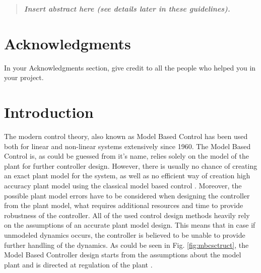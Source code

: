 \documentclass[]{final_report}
\begin{document}
\maketitle

\tableofcontents
\newpage


\begin{abstract}

\textbf{\textsl{Insert abstract here (see details later in these guidelines).}}

\end{abstract}
\newpage


\chapter*{Acknowledgments}

In your Acknowledgments section, give credit to all the people who helped you in your project.


\chapter{Introduction}
The modern control theory, also known as Model Based Control has been used both for linear and non-linear systems extensively since 1960. The Model Based Control is, as could be guessed from it's name, relies solely on the model of the plant for further controller design. However, there is usually no chance of creating an exact plant model for the system, as well as no efficient way of creation high accuracy plant model using the classical model based control \cite{hou2013model}. Moreover, the possible plant model errors have to be considered when designing the controller from the plant model, what requires additional resources and time to provide robustness of the controller. All of the used control design methods heavily rely on the assumptions of an accurate plant model design. This means that in case if unmodeled dynamics occurs, the controller is believed to be unable to provide further handling of the dynamics. As could be seen in Fig. \ref{fig:mbcsctruct}, the Model Based Controller design starts from the assumptions about the model plant and is directed at regulation of the plant \cite{hou2013model}.
\end{document}
